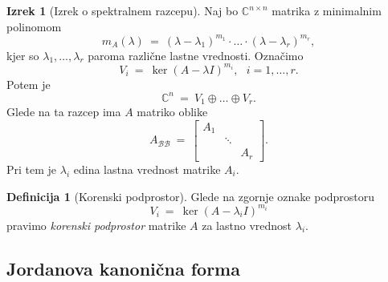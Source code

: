 \documentclass[11pt]{article}
\newcommand{\0}{\mathbf{0}}
\newcommand{\B}{\mathscr{B}}
\theoremstyle{definition}
\newtheorem{definicija}{Definicija}[section]
\theoremstyle{definition}
\theoremstyle{definition}
\newtheorem{izrek}{Izrek}[section]
\theoremstyle{definition}
\begin{document}
\begin{izrek}[Izrek o spektralnem razcepu]

Naj bo $\mathbb{C}^{n \times n}$ matrika z minimalnim polinomom
$$m_A(\lambda) ~=~ (\lambda-\lambda_1)^{m_1}\cdot\ldots\cdot(\lambda-\lambda_r)^{m_r},$$
kjer so $\lambda_1,\ldots,\lambda_r$ paroma različne lastne vrednosti. Označimo
$$V_i ~=~ \ker (A-\lambda I)^{m_i}, ~~~i = 1,\ldots,r.$$
Potem je
$$\mathbb{C}^n ~=~ V_1 \oplus \ldots \oplus V_r.$$
Glede na ta razcep ima $A$ matriko oblike
$$A_{\B\B} ~=~ \begin{bmatrix}
A_1 & ~ & ~ \\
~ & \ddots & ~ \\
~ & ~ & A_r
\end{bmatrix}.$$
Pri tem je $\lambda_i$ edina lastna vrednost matrike $A_i$. 

\end{izrek}
\vspace{0.5cm}


\begin{definicija}[Korenski podprostor]

Glede na zgornje oznake podprostoru
$$V_i ~=~ \ker(A-\lambda_i I)^{m_i}$$
pravimo \textit{korenski podprostor} matrike $A$ za lastno vrednost $\lambda_i$.

\end{definicija}
\vspace{0.5cm}


\subsection{Jordanova kanonična forma}
\vspace{0.5cm}
\end{document}
